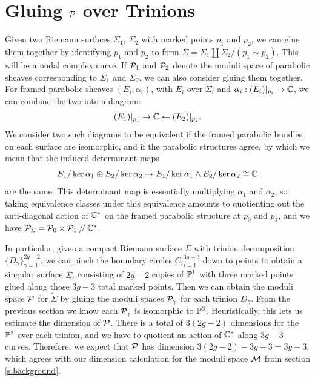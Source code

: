 	\section{Gluing $\mathcal{P}$ over Trinions }
	\label{s:p-gluing}
	Given two Riemann surfaces $\Sigma_1$, $\Sigma_2$ with marked points $p_1$ and $p_2$, we can glue them together by identifying $p_1$ and $p_2$ to form $\Sigma = \Sigma_1 \coprod \Sigma_2 / (p_1 \sim p_2)$. This will be a nodal complex curve. If $\mathcal{P}_1$ and $\mathcal{P}_2$ denote the moduli space of parabolic sheaves corresponding to $\Sigma_1$ and $\Sigma_2$, we can also consider gluing them together. For framed parabolic sheaves $(E_i,\alpha_i)$, with $E_i$ over $\Sigma_i$ and $\alpha_i:(E_i)|_{p_i}\to \mathbb{C}$, we can combine the two into a diagram:
	\begin{equation}
		(E_1)|_{p_1} \rightarrow \mathbb{C} \leftarrow (E_2)|_{p_2}.
	\end{equation}
	We consider two such diagrams to be equivalent if the framed parabolic bundles on each surface are isomorphic, and if the parabolic structures agree, by which we mean that the induced determinant maps
	\begin{equation}
		E_1/\ker\alpha_1\oplus E_2/\ker\alpha_2 \to  E_1/\ker\alpha_1 \wedge E_2/\ker\alpha_2 \cong \mathbb{C}
	\end{equation} are the same. This determinant map is essentially multiplying $\alpha_1$ and $\alpha_2$, so taking equivalence classes under this equivalence amounts to quotienting out the anti-diagonal action of $\mathbb{C}^\ast$ on the framed parabolic structure at $p_0$ and $p_1$, and we have $\mathcal{P}_{\Sigma} = \mathcal{P}_0 \times \mathcal{P}_1 \mathbin{/\mkern-4mu/} \mathbb{C}^\ast$. 
	
	In particular, given a compact Riemann surface $\Sigma$ with trinion decomposition $\{D_\gamma\}_{\gamma=1}^{2g-2}$, we can pinch the boundary circles ${C_i}_{i=1}^{3g-3}$ down to points to obtain a singular surface $\tilde{\Sigma}$, consisting of $2g-2$ copies of $\mathbb{P}^1$ with three marked points glued along those $3g-3$ total marked points. Then we can obtain the moduli space $\mathcal{P}$ for $\tilde{\Sigma}$ by gluing the moduli spaces $\mathcal{P}_\gamma$ for each trinion $D_\gamma$. From the previous section we know each $\mathcal{P}_\gamma$ is isomorphic to $\mathbb{P}^3$. Heuristically, this lets us estimate the dimension of $\mathcal{P}$. There is a total of $3(2g-2)$ dimensions for the $\mathbb{P}^3$ over each trinion, and we have to quotient an action of $\mathbb{C}^\ast$ along $3g-3$ curves. Therefore, we expect that $\mathcal{P}$ has dimension $3(2g-2)-3g-3 = 3g-3$, which agrees with our dimension calculation for the moduli space $\mathcal{M}$ from section \ref{s:background}. 
	
